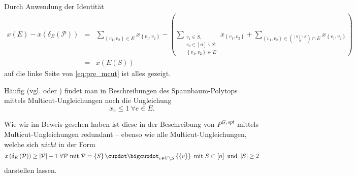 \documentclass[10p,a4paper,BCOR = 12mm, DIV=15]{scrbook}
\begin{document}
\begin{bew}
Durch Anwendung der Identität
\begin{eqnarray*}
x\left(E\right) - x\left(\delta_E\left(\mathcal{P}\right)\right) & = & \sum_{\left\{v_1, v_2\right\} \in E} x_{\left\{v_1, v_2\right\}} - \left(\sum_{\substack{
v_1 \in S, \\
v_2 \in \left[n\right] \backslash S: \\
\left\{v_1, v_2\right\} \in E}} x_{\left\{v_1, v_2\right\}} + \sum_{\left\{v_1, v_2\right\} \in {\left[n\right] \backslash S \choose 2} \cap E} x_{\left\{v_1, v_2\right\}}\right) \\
& = & x\left(E\left(S\right)\right)
\end{eqnarray*}
auf die linke Seite von \eqref{eq:pre_mcut} ist alles gezeigt.
\end{bew}

\begin{Bem}
\label{bem:spt_multicut_reduziert}
Häufig (vgl. \cite{magnanti_wolsey1995} oder \cite{korte2012combinatorial}) findet man in Beschreibungen des Spann\-baum-Polytops mittels Multicut-Ungleichungen noch die Ungleichung
\begin{displaymath}
x_e \leq 1 \ \forall e \in E.
\end{displaymath}

Wie wir im Beweis gesehen haben ist diese in der Beschreibung von $P^{G, spt}$ mittels Multicut-Ungleichungen redundant -- ebenso wie alle Multicut-Ungleichungen, welche sich \emph{nicht} in der Form
\begin{displaymath}
x\left(\delta_E\left(\mathcal{P}\right)\right) \geq \left|\mathcal{P}\right|-1\ \forall \mathcal{P} \textnormal{ mit } \mathcal{P} = \left\{S\right\} \cupdot \bigcupdot_{v \in V \backslash S} \left\{\left\{v\right\}\right\} \textnormal{ mit } S \subset \left[n\right] \textnormal{ und } \left|S\right| \geq 2
\end{displaymath}
darstellen lassen.
\end{Bem}
\end{document}
